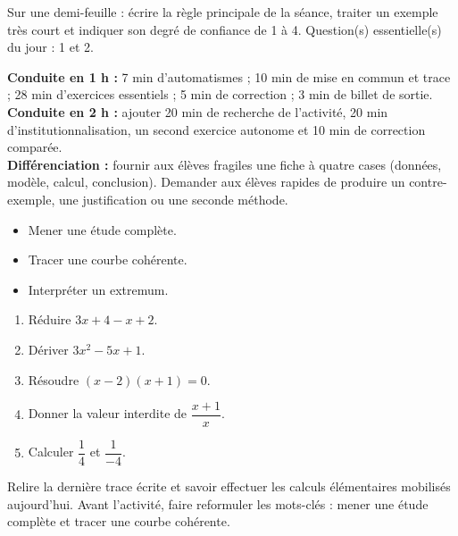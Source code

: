 \begin{exitticket}[3 minutes]Sur une demi-feuille : écrire la règle principale de la séance, traiter un exemple très court et indiquer son degré de confiance de 1 à 4. Question(s) essentielle(s) du jour : 1 et 2.\end{exitticket}

\ifmxteacher
\begin{method}
\textbf{Conduite en 1 h :} 7 min d'automatismes ; 10 min de mise en commun et trace ; 28 min d'exercices essentiels ; 5 min de correction ; 3 min de billet de sortie.\\
\textbf{Conduite en 2 h :} ajouter 20 min de recherche de l'activité, 20 min d'institutionnalisation, un second exercice autonome et 10 min de correction comparée.\\
\textbf{Différenciation :} fournir aux élèves fragiles une fiche à quatre cases (données, modèle, calcul, conclusion). Demander aux élèves rapides de produire un contre-exemple, une justification ou une seconde méthode.
\end{method}
\fi
{}
\begin{objectives}\begin{itemize}\item Mener une étude complète.\item Tracer une courbe cohérente.\item Interpréter un extremum.\end{itemize}\end{objectives}
\begin{fluency}\begin{enumerate}\item Réduire $3x+4-x+2$. \item Dériver $3x^2-5x+1$. \item Résoudre $(x-2)(x+1)=0$. \item Donner la valeur interdite de $\dfrac{x+1}{x}$. \item Calculer $\dfrac1{4}$ et $\dfrac1{-4}$. \end{enumerate}\end{fluency}
\begin{prerequisites}Relire la dernière trace écrite et savoir effectuer les calculs élémentaires mobilisés aujourd'hui. Avant l'activité, faire reformuler les mots-clés : mener une étude complète et tracer une courbe cohérente.\end{prerequisites}

